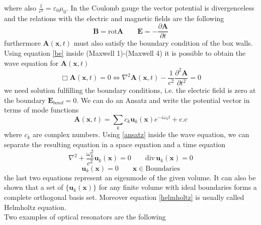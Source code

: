 \documentclass[12pt]{article}
\theoremstyle{plain}
\newcommand{\x}{\mathbf{x}}
\theoremstyle{definition}
\theoremstyle{remark}
\begin{document}
where also $\frac{1}{c^2} = \varepsilon_0\mu_0$. In the Coulomb gauge the vector potential is divergenceless and the relations with the electric and magnetic fields are the following
\begin{equation}\label{be}\mathbf{B} = \text{rot}\mathbf{A} \qquad \mathbf{E} = -\frac{\partial \mathbf{A}}{\partial t} \end{equation}
furthermore $\mathbf{A}(\x,t)$ must also satisfy the boundary condition of the box walls. Using equation \eqref{be} inside (Maxwell 1)-(Maxwell 4) it is possible to obtain the wave equation for $\mathbf{A}(\x,t)$
\begin{equation}\Box \mathbf{A}(\x,t) = 0 \iff \nabla^2 \mathbf{A}(\x,t)-\frac{1}{c^2}\frac{\partial^2\mathbf{A}}{\partial t^2} = 0\end{equation}
we need solution fulfilling the boundary conditions, i.e. the electric field is zero at the boundary $\mathbf{E}_{bond} = 0$. We can do an Ansatz and write the potential vector in terms of mode functions
\begin{equation}\label{ansatz}\mathbf{A}(\x,t) = \sum_k c_k \mathbf{u}_k(\x) e^{-i\omega_k t} + \text{c.c}\end{equation}
where $c_k$ are complex numbers. Using \eqref{ansatz} inside the wave equation, we can separate the resulting equation in a space equation and a time equation
\begin{equation}\label{helmholtz}\nabla^2 + \frac{\omega_k^2}{c^2}\mathbf{u}_k(\x)  = 0 \qquad \text{div}\,\mathbf{u}_k(\x) = 0\end{equation}
\begin{equation}\mathbf{u}_k(\x) = 0 \qquad \x \in \text{Boundaries}\end{equation}
the last two equations represent an eigenmode of the given volume. It can also be shown that a set of $\{\mathbf{u}_k(\x) \}$ for any finite volume with ideal boundaries forms a complete orthogonal basis set. Moreover equation \eqref{helmholtz} is usually called Helmholtz equation.\\
Two examples of optical resonators are the following
\end{document}
